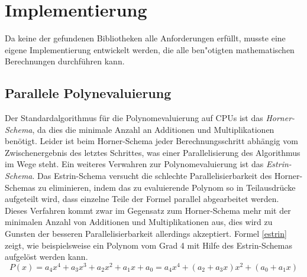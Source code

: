 \section{Implementierung}

Da keine der gefundenen Bibliotheken alle Anforderungen erfüllt, musste eine eigene Implementierung entwickelt werden, die alle ben"otigten mathematischen Berechnungen durchführen kann.

\subsection{Parallele Polynevaluierung}
Der Standardalgorithmus für die Polynomevaluierung auf CPUs ist das \textit{Horner-Schema}, da dies die minimale Anzahl an Additionen und Multiplikationen benötigt\cite{Ostrowski:1954}\cite{Pan:1966}. Leider ist beim Horner-Schema jeder Berechnungsschritt abhängig vom Zwischenergebnis des letztes Schrittes, was einer Parallelisierung des Algorithmus im Wege steht.\newline
Ein weiteres Verwahren zur Polynomevaluierung ist das \textit{Estrin-Schema}\cite{EstrinsScheme}. Das Estrin-Schema versucht die schlechte Parallelisierbarkeit des Horner-Schemas zu eliminieren, indem das zu evaluierende Polynom so in Teilausdrücke aufgeteilt wird, dass einzelne Teile der Formel parallel abgearbeitet werden. Dieses Verfahren kommt zwar im Gegensatz zum Horner-Schema mehr mit der minimalen Anzahl von Additionen und Multiplikationen aus, dies wird zu Gunsten der besseren Parallelisierbarkeit allerdings akzeptiert.\newline
Formel \eqref{estrin} zeigt, wie beispielsweise ein Polynom vom Grad 4 mit Hilfe des Estrin-Schemas aufgelöst werden kann.
\begin{equation}\label{estrin}
P(x) = a_4x^4 + a_3x^3 + a_2x^2 + a_1x + a_0 = a_4x^4 + (a_2+a_3x)x^2 + (a_0+a_1x)
\end{equation}

